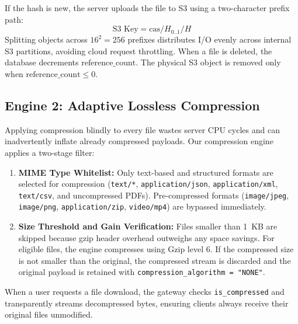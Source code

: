 \documentclass[conference]{IEEEtran}
\begin{document}
If the hash is new, the server uploads the file to S3 using a two-character prefix path:
\begin{equation}
\text{S3 Key} = \text{cas}/H_{0..1}/H
\end{equation}
Splitting objects across $16^2 = 256$ prefixes distributes I/O evenly across internal S3 partitions, avoiding cloud request throttling. When a file is deleted, the database decrements $\text{reference\_count}$. The physical S3 object is removed only when $\text{reference\_count} \le 0$.

\subsection{Engine 2: Adaptive Lossless Compression}
Applying compression blindly to every file wastes server CPU cycles and can inadvertently inflate already compressed payloads. Our compression engine applies a two-stage filter:
\begin{enumerate}
    \item \textbf{MIME Type Whitelist:} Only text-based and structured formats are selected for compression (\texttt{text/*}, \texttt{application/json}, \texttt{application/xml}, \texttt{text/csv}, and uncompressed PDFs). Pre-compressed formats (\texttt{image/jpeg}, \texttt{image/png}, \texttt{application/zip}, \texttt{video/mp4}) are bypassed immediately.
    \item \textbf{Size Threshold and Gain Verification:} Files smaller than 1~KB are skipped because gzip header overhead outweighs any space savings. For eligible files, the engine compresses using Gzip level 6. If the compressed size is not smaller than the original, the compressed stream is discarded and the original payload is retained with \texttt{compression\_algorithm = "NONE"}.
\end{enumerate}
When a user requests a file download, the gateway checks \texttt{is\_compressed} and transparently streams decompressed bytes, ensuring clients always receive their original files unmodified.
\end{document}
